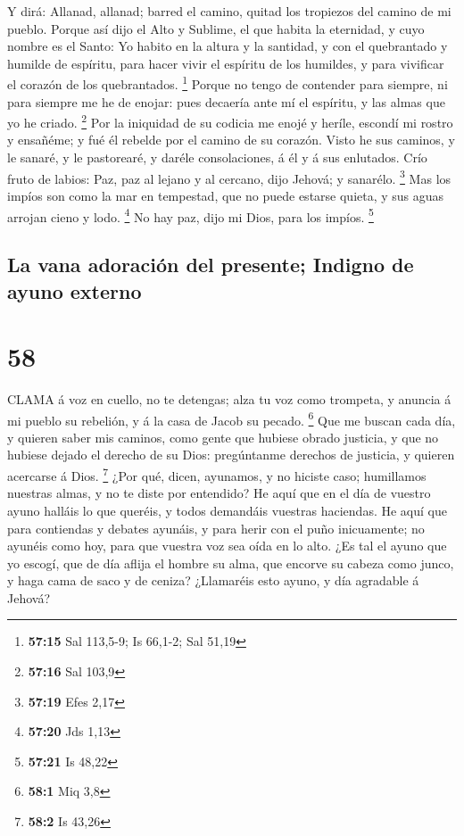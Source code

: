  Y dirá: Allanad, allanad; barred el camino, quitad los
tropiezos del camino de mi pueblo.  Porque así dijo el Alto
y Sublime, el que habita la eternidad, y cuyo nombre es el Santo: Yo
habito en la altura y la santidad, y con el quebrantado y humilde de
espíritu, para hacer vivir el espíritu de los humildes, y para vivificar
el corazón de los quebrantados. \footnote{\textbf{57:15} Sal 113,5-9; Is
  66,1-2; Sal 51,19}  Porque no tengo de contender para
siempre, ni para siempre me he de enojar: pues decaería ante mí el
espíritu, y las almas que yo he criado. \footnote{\textbf{57:16} Sal
  103,9}  Por la iniquidad de su codicia me enojé y heríle,
escondí mi rostro y ensañéme; y fué él rebelde por el camino de su
corazón.  Visto he sus caminos, y le sanaré, y le
pastorearé, y daréle consolaciones, á él y á sus enlutados.
 Crío fruto de labios: Paz, paz al lejano y al cercano,
dijo Jehová; y sanarélo. \footnote{\textbf{57:19} Efes 2,17}
 Mas los impíos son como la mar en tempestad, que no puede
estarse quieta, y sus aguas arrojan cieno y lodo. \footnote{\textbf{57:20}
  Jds 1,13}  No hay paz, dijo mi Dios, para los impíos.
\footnote{\textbf{57:21} Is 48,22}

\hypertarget{la-vana-adoraciuxf3n-del-presente-indigno-de-ayuno-externo}{%
\subsection{La vana adoración del presente; Indigno de ayuno
externo}\label{la-vana-adoraciuxf3n-del-presente-indigno-de-ayuno-externo}}

\hypertarget{section-57}{%
\section{58}\label{section-57}}

 CLAMA á voz en cuello, no te detengas; alza tu voz como
trompeta, y anuncia á mi pueblo su rebelión, y á la casa de Jacob su
pecado. \footnote{\textbf{58:1} Miq 3,8}  Que me buscan cada
día, y quieren saber mis caminos, como gente que hubiese obrado
justicia, y que no hubiese dejado el derecho de su Dios: pregúntanme
derechos de justicia, y quieren acercarse á Dios. \footnote{\textbf{58:2}
  Is 43,26}  ¿Por qué, dicen, ayunamos, y no hiciste caso;
humillamos nuestras almas, y no te diste por entendido? He aquí que en
el día de vuestro ayuno halláis lo que queréis, y todos demandáis
vuestras haciendas.  He aquí que para contiendas y debates
ayunáis, y para herir con el puño inicuamente; no ayunéis como hoy, para
que vuestra voz sea oída en lo alto.  ¿Es tal el ayuno que
yo escogí, que de día aflija el hombre su alma, que encorve su cabeza
como junco, y haga cama de saco y de ceniza? ¿Llamaréis esto ayuno, y
día agradable á Jehová?

